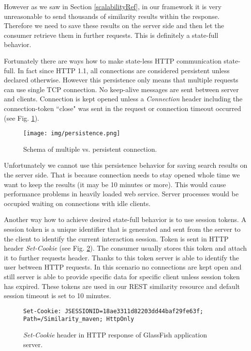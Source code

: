 \documentclass[thesis=M,english]{FITthesis}[2012/10/20]
\begin{document}
However as we saw in Section \ref{scalabilityRef}, in our framework it is very unreasonable to send thousands of similarity results within the response. Therefore we need to save these results on the server side and then let the consumer retrieve them in further requests. This is definitely a state-full behavior.

Fortunately there are ways how to make state-less HTTP communication state-full. In fact since HTTP 1.1, all connections are considered persistent unless declared otherwise. However this persistence only means that multiple requests can use single TCP connection. No keep-alive messages are sent between server and clients. Connection is kept opened unless a \textit{Connection} header including the connection-token ``close" was sent in the request or connection timeout occurred (see Fig. \ref{fig:persistence}). 

\begin{figure}
  \centering
  \texttt{[image: img/persistence.png]}
  \caption{Schema of multiple vs. persistent connection.\cite{wikipersistent}}
  \label{fig:persistence}
\end{figure}

Unfortunately we cannot use this persistence behavior for saving search results on the server side. That is because connection needs to stay opened whole time we want to keep the results (it may be 10 minutes or more). This would cause performance problems in heavily loaded web service. Server processes would be occupied waiting on connections with idle clients.

Another way how to achieve desired state-full behavior is to use session tokens. A session token is a unique identifier that is generated and sent from the server to the client to identify the current interaction session. Token is sent in HTTP header \textit{Set-Cookie} (see Fig. \ref{sessionToken}). The consumer usually stores this token and attach it to further requests header. Thanks to this token server is able to identify the user between HTTP requests. In this scenario no connections are kept open and still server is able to provide specific data for specific client unless session token has expired. These tokens are used in our REST similarity resource and default session timeout is set to 10 minutes.

\begin{figure}
\begin{lstlisting}
Set-Cookie: JSESSIONID=18ae3311d82203dd44baf29fe63f; Path=/Similarity_maven; HttpOnly
\end{lstlisting}
\caption{\textit{Set-Cookie} header in HTTP response of GlassFish application server.}
\label{sessionToken}
\end{figure}
\end{document}
